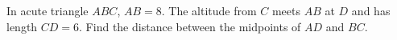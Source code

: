 In acute triangle $ABC$, $AB=8$. The altitude from $C$ meets $AB$ at $D$ and has length $CD=6$. Find the distance between the midpoints of $AD$ and $BC$.

